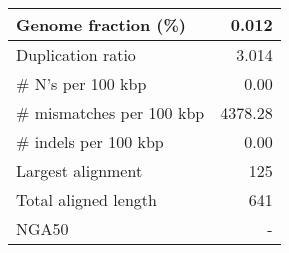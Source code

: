 \documentclass[12pt,a4paper]{article}
\begin{document}
\begin{table}[ht]
\begin{center}
\begin{tabular}{|l*{1}{|r}|}
Genome fraction (\%) & 0.012 \\ \hline
Duplication ratio & 3.014 \\ \hline
\# N's per 100 kbp & 0.00 \\ \hline
\# mismatches per 100 kbp & 4378.28 \\ \hline
\# indels per 100 kbp & 0.00 \\ \hline
Largest alignment & 125 \\ \hline
Total aligned length & 641 \\ \hline
NGA50 & - \\ \hline
\end{tabular}
\end{center}
\end{table}
\end{document}
